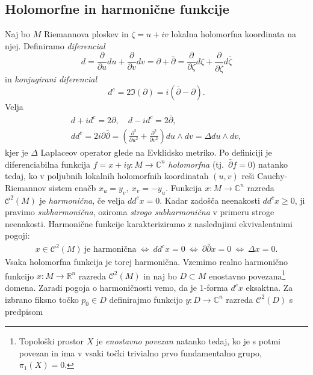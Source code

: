 \documentclass[12pt,a4paper,twoside]{article}
\theoremstyle{definition} %
\theoremstyle{plain} %
\numberwithin{equation}{section}  %
\begin{document}
\subsection{Holomorfne in harmonične funkcije}
%
Naj bo $M$ Riemannova ploskev in $\zeta = u+iv$ lokalna holomorfna koordinata na njej. 
Definiramo \emph{diferencial} 
\begin{equation}
d = \frac{\partial}{\partial u}du + \frac{\partial}{\partial v}dv = \partial + \bar{\partial} = \frac{\partial}{\partial \zeta}d\zeta + \frac{\partial}{\partial \bar{\zeta}}d\bar{\zeta}
\end{equation}
in \emph{konjugirani diferencial}
\begin{equation}
d^{c} = 2 \Im(\partial) = i(\bar{\partial} - \partial).
\end{equation}
Velja
\begin{gather*}
d + id^{c} = 2\partial , \quad  d - id^{c} = 2\bar{\partial}, \\
dd^{c} = 2i\partial \bar{\partial} = \left( \frac{\partial^2}{\partial u^2} + \frac{\partial^2}{\partial v^2} \right) du \wedge dv = \Delta du \wedge dv,
\end{gather*}
kjer je $\Delta$ Laplaceov operator glede na Evklidsko metriko.\newline
%
Po definiciji je diferenciabilna funkcija $f = x + iy \colon M \to \mathbb{C}^{n}$ \emph{holomorfna} (tj.~$\bar{\partial}f = 0$) natanko tedaj, ko v poljubnih lokalnih holomorfnih koordinatah $(u,v)$ reši Cauchy-Riemannov sistem enačb $x_{u}=y_{v}, \ x_{v}=-y_{u}$.\newline
%
Funkcija $x \colon M \to \mathbb{C}^{n}$ razreda $\mathcal{C}^2(M)$ je \emph{harmonična}, če velja $dd^{c}x=0$.
Kadar zadošča neenakosti $dd^{c}x \geq 0$, ji pravimo \emph{subharmonična}, oziroma \emph{strogo subharmonična} v primeru stroge neenakosti.
Harmonične funkcije karakteriziramo z naslednjimi ekvivalentnimi pogoji:
\begin{gather*}
x \in \mathcal{C}^2(M) \ \text{je harmonična} \ \iff \ dd^{c}x=0 \ \iff \ \partial \bar{\partial}x=0 \ \iff \ \Delta x=0.
\end{gather*}
Vsaka holomorfna funkcija je torej harmonična. 
Vzemimo realno harmonično funkcijo $x \colon M \to \mathbb{R}^{n}$ razreda $\mathcal{C}^2(M)$ in naj bo $D \subset M$ enostavno povezana\footnote{Topološki prostor $X$ je \emph{enostavno povezan} natanko tedaj, ko je s potmi povezan in ima v vsaki točki trivialno prvo fundamentalno grupo, $\pi_{1}(X)=0$.} domena. Zaradi pogoja o harmoničnosti vemo, da je 1-forma $d^{c}x$ eksaktna. Za izbrano fiksno točko $p_{0} \in D$ definirajmo funkcijo $y \colon D \to \mathbb{C}^{n}$ razreda $\mathcal{C}^2(D)$ s predpisom
\end{document}

